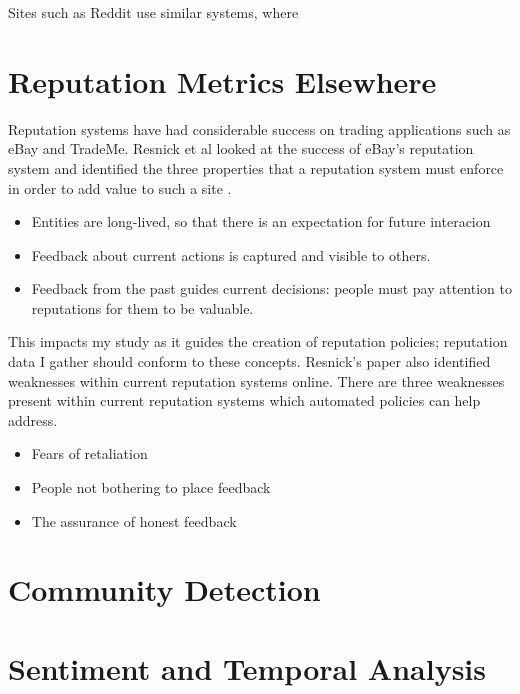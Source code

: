 Sites such as Reddit use similar systems, where 

\section{Reputation Metrics Elsewhere}

Reputation systems have had considerable success on trading applications such as eBay and TradeMe. Resnick et al looked at the success of eBay's reputation system and identified the three properties that a reputation system must enforce in order to add value to such a site \cite{}. 

\begin{itemize}
 \item Entities are long-lived, so that there is an expectation for future interacion
 \item Feedback about current actions is captured and visible to others.
 \item Feedback from the past guides current decisions: people must pay attention to reputations for them to be valuable. 
\end{itemize}

This impacts my study as it guides the creation of reputation policies; reputation data I gather should conform to these concepts. Resnick's paper also identified weaknesses within current reputation systems online. There are three weaknesses present within current reputation systems which automated policies can help address. 

\begin{itemize}
 \item Fears of retaliation
 \item People not bothering to place feedback
 \item The assurance of honest feedback
\end{itemize}



\section{Community Detection}

\section{Sentiment and Temporal Analysis}

